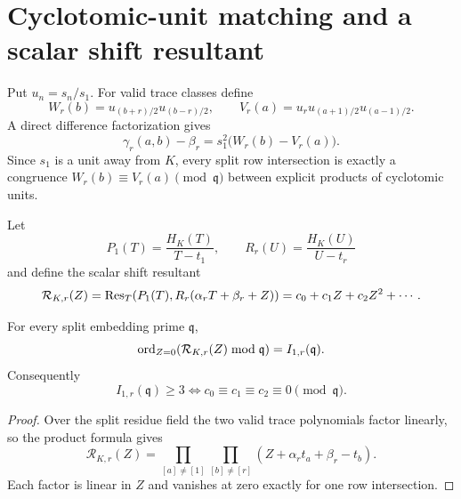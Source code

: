 \section{Cyclotomic-unit matching and a scalar shift resultant}

Put $u_n=s_n/s_1$.  For valid trace classes define
\begin{equation}\label{eq:WV}
W_r(b)=u_{(b+r)/2}u_{(b-r)/2},\qquad
V_r(a)=u_ru_{(a+1)/2}u_{(a-1)/2}.
\end{equation}
A direct difference factorization gives
\begin{equation}\label{eq:unitmatch}
\gamma_r(a,b)-\beta_r=s_1^2\bigl(W_r(b)-V_r(a)\bigr).
\end{equation}
Since $s_1$ is a unit away from $K$, every split row intersection is exactly a
congruence $W_r(b)\equiv V_r(a)\pmod{\mathfrak q}$ between explicit products
of cyclotomic units.

Let
\[
P_1(T)=\frac{H_K(T)}{T-t_1},\qquad
R_r(U)=\frac{H_K(U)}{U-t_r}
\]
and define the scalar shift resultant
\begin{equation}\label{eq:shiftres}
\mathcal R_{K,r}(Z)
 =\operatorname{Res}_T\!\left(P_1(T),R_r(\alpha_rT+\beta_r+Z)\right)
 =c_0+c_1Z+c_2Z^2+\cdots.
\end{equation}

\begin{theorem}\label{thm:scalar-support}
For every split embedding prime $\mathfrak q$,
\begin{equation}\label{eq:ordshift}
\operatorname{ord}_{Z=0}(\mathcal R_{K,r}(Z)\bmod\mathfrak q)
 =I_{1,r}(\mathfrak q).
\end{equation}
Consequently
\[
I_{1,r}(\mathfrak q)\ge3
\iff
c_0\equiv c_1\equiv c_2\equiv0\pmod{\mathfrak q}.
\]
\end{theorem}

\begin{proof}
Over the split residue field the two valid trace polynomials factor linearly,
so the product formula gives
\[
\mathcal R_{K,r}(Z)
 =\prod_{[a]\ne[1]}\prod_{[b]\ne[r]}
   (Z+\alpha_rt_a+\beta_r-t_b).
\]
Each factor is linear in $Z$ and vanishes at zero exactly for one row
intersection.
\end{proof}

